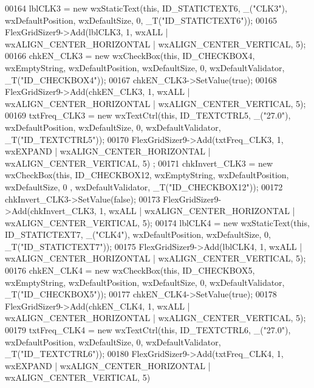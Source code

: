 \begin{DoxyCode}
00164     lblCLK3 = \textcolor{keyword}{new} wxStaticText(\textcolor{keyword}{this}, ID\_STATICTEXT6, \_(\textcolor{stringliteral}{"CLK3"}), wxDefaultPosition, wxDefaultSize, 0, 
      _T(\textcolor{stringliteral}{"ID\_STATICTEXT6"}));
00165     FlexGridSizer9->Add(lblCLK3, 1, wxALL | wxALIGN\_CENTER\_HORIZONTAL | wxALIGN\_CENTER\_VERTICAL, 5);
00166     chkEN\_CLK3 = \textcolor{keyword}{new} wxCheckBox(\textcolor{keyword}{this}, ID\_CHECKBOX4, wxEmptyString, wxDefaultPosition, wxDefaultSize, 0, 
      wxDefaultValidator, _T(\textcolor{stringliteral}{"ID\_CHECKBOX4"}));
00167     chkEN\_CLK3->SetValue(\textcolor{keyword}{true});
00168     FlexGridSizer9->Add(chkEN\_CLK3, 1, wxALL | wxALIGN\_CENTER\_HORIZONTAL | wxALIGN\_CENTER\_VERTICAL, 5);
00169     txtFreq\_CLK3 = \textcolor{keyword}{new} wxTextCtrl(\textcolor{keyword}{this}, ID\_TEXTCTRL5, \_(\textcolor{stringliteral}{"27.0"}), wxDefaultPosition, wxDefaultSize, 0, 
      wxDefaultValidator, _T(\textcolor{stringliteral}{"ID\_TEXTCTRL5"}));
00170     FlexGridSizer9->Add(txtFreq\_CLK3, 1, wxEXPAND | wxALIGN\_CENTER\_HORIZONTAL | wxALIGN\_CENTER\_VERTICAL, 5)
      ;
00171     chkInvert\_CLK3 = \textcolor{keyword}{new} wxCheckBox(\textcolor{keyword}{this}, ID\_CHECKBOX12, wxEmptyString, wxDefaultPosition, wxDefaultSize, 0
      , wxDefaultValidator, _T(\textcolor{stringliteral}{"ID\_CHECKBOX12"}));
00172     chkInvert\_CLK3->SetValue(\textcolor{keyword}{false});
00173     FlexGridSizer9->Add(chkInvert\_CLK3, 1, wxALL | wxALIGN\_CENTER\_HORIZONTAL | wxALIGN\_CENTER\_VERTICAL, 5);
00174     lblCLK4 = \textcolor{keyword}{new} wxStaticText(\textcolor{keyword}{this}, ID\_STATICTEXT7, \_(\textcolor{stringliteral}{"CLK4"}), wxDefaultPosition, wxDefaultSize, 0, 
      _T(\textcolor{stringliteral}{"ID\_STATICTEXT7"}));
00175     FlexGridSizer9->Add(lblCLK4, 1, wxALL | wxALIGN\_CENTER\_HORIZONTAL | wxALIGN\_CENTER\_VERTICAL, 5);
00176     chkEN\_CLK4 = \textcolor{keyword}{new} wxCheckBox(\textcolor{keyword}{this}, ID\_CHECKBOX5, wxEmptyString, wxDefaultPosition, wxDefaultSize, 0, 
      wxDefaultValidator, _T(\textcolor{stringliteral}{"ID\_CHECKBOX5"}));
00177     chkEN\_CLK4->SetValue(\textcolor{keyword}{true});
00178     FlexGridSizer9->Add(chkEN\_CLK4, 1, wxALL | wxALIGN\_CENTER\_HORIZONTAL | wxALIGN\_CENTER\_VERTICAL, 5);
00179     txtFreq\_CLK4 = \textcolor{keyword}{new} wxTextCtrl(\textcolor{keyword}{this}, ID\_TEXTCTRL6, \_(\textcolor{stringliteral}{"27.0"}), wxDefaultPosition, wxDefaultSize, 0, 
      wxDefaultValidator, _T(\textcolor{stringliteral}{"ID\_TEXTCTRL6"}));
00180     FlexGridSizer9->Add(txtFreq\_CLK4, 1, wxEXPAND | wxALIGN\_CENTER\_HORIZONTAL | wxALIGN\_CENTER\_VERTICAL, 5)

\end{DoxyCode}
